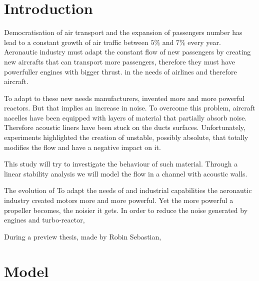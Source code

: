 \documentclass[ border=0pt, a4paper, 11pt]{article}
\numberwithin{equation}{section}
\numberwithin{equation}{section}
\begin{document}
\section{Introduction}
Democratisation of air transport and the expansion of passengers number has lead to a constant growth of air traffic between $5\%$ and $7\%$ every year. Aeronautic industry must adapt the constant flow of new passengers by creating new aircrafts that can transport more passengers, therefore they must have powerfuller engines with bigger thrust.  in the needs of airlines and therefore aircraft.

To adapt to these new needs manufacturers, invented more and more powerful reactors. But that implies an increase in noise. To overcome this problem, aircraft nacelles have been equipped with layers of material that partially absorb noise. Therefore acoustic liners have been stuck on the ducts surfaces. Unfortunately, experiments highlighted the creation of unstable, possibly absolute, that totally modifies the flow and have a negative impact on it. 

This study will try to investigate the behaviour of such material. Through a linear stability analysis we will model the flow in a channel with acoustic walls.




The evolution of To adapt the needs of  and industrial capabilities the aeronautic industry created motors more and more powerful. Yet the more powerful a propeller becomes, the noisier it gets.
In order to reduce the noise generated by engines and turbo-reactor,




During a preview thesis, made by Robin Sebastian,
\newpage
\section{Model}
\end{document}
